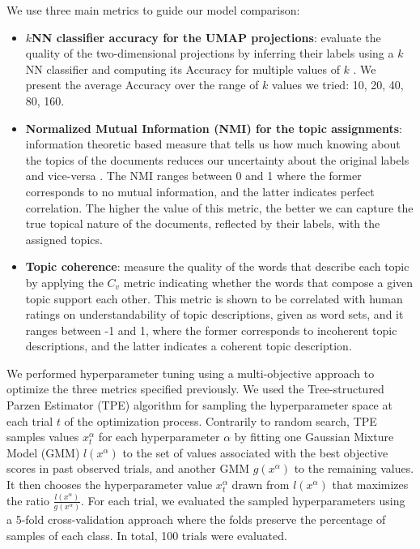 \documentclass[a4paper]{article}
\begin{document}
We use three main metrics to guide our model comparison: 
\begin{itemize}
  \item \textbf{$k$NN classifier accuracy for the UMAP projections}: evaluate the quality of the two-dimensional projections by inferring their labels using a $k$NN classifier and computing its Accuracy for multiple values of $k$ \citep{mcinnes2020}. We present the average Accuracy over the range of $k$ values we tried: 10, 20, 40, 80, 160.
  \item \textbf{Normalized Mutual Information (NMI) for the topic assignments}: information theoretic based measure that tells us how much knowing about the topics of the documents reduces our uncertainty about the original labels and vice-versa \citep{vinh2009}. The NMI ranges between 0 and 1 where the former corresponds to no mutual information, and the latter indicates perfect correlation. The higher the value of this metric, the better we can capture the true topical nature of the documents, reflected by their labels, with the assigned topics.
  \item \textbf{Topic coherence}: measure the quality of the words that describe each topic by applying the $C_v$ metric \citep{roder2015} indicating whether the words that compose a given topic support each other. This metric is shown to be correlated with human ratings on understandability of topic descriptions, given as word sets, and it ranges between -1 and 1, where the former corresponds to incoherent topic descriptions, and the latter indicates a coherent topic description.
\end{itemize}

We performed hyperparameter tuning using a multi-objective approach to optimize the three metrics specified previously. We used the Tree-structured Parzen Estimator (TPE) algorithm \citep{bergstra2011, ozaki2020} for sampling the hyperparameter space at each trial $t$ of the optimization process. Contrarily to random search, TPE samples values $x_t^\alpha$ for each hyperparameter $\alpha$ by fitting one Gaussian Mixture Model (GMM) $l(x^\alpha)$ to the set of values associated with the best objective scores in past observed trials, and another GMM $g(x^\alpha)$ to the remaining values. It then chooses the hyperparameter value $x_t^\alpha$ drawn from $l(x^\alpha)$ that maximizes the ratio $\frac{l(x^\alpha)}{g(x^\alpha)}$. For each trial, we evaluated the sampled hyperparameters using a 5-fold cross-validation approach where the folds preserve the percentage of samples of each class. In total, 100 trials were evaluated.
\end{document}

